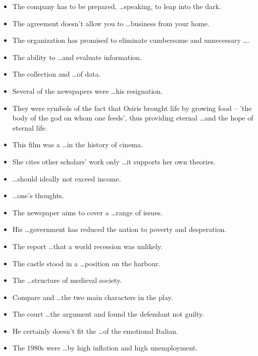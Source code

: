 \documentclass[a4paper,10pt]{article}
\theoremstyle{discussion_style} \newtheorem{discussion}{\color{red}{Discussion point}}
\theoremstyle{theorem_style} \newtheorem{theorem}{Theorem}
\begin{document}
\begin{itemize}
\item The company has to be prepared, \ldots speaking, to leap into the dark.
\item The agreement doesn't allow you to \ldots business from your home.
\item The organization has promised to eliminate cumbersome and unnecessary \ldots.
\item The ability to \ldots and evaluate information.
\item The collection and \ldots of data.
\item Several of the newspapers were \ldots his resignation.
\item They were symbols of the fact that Osiris brought life by growing food -- 'the body of the god on whom one feeds', thus providing eternal \ldots and the hope of eternal life.
\item This film was a \ldots in the history of cinema.
\item She cites other scholars' work only \ldots it supports her own theories.
\item \ldots should ideally not exceed income.
\item \ldots one's thoughts.
\item The newspaper aims to cover a \ldots range of issues.
\item His \ldots government has reduced the nation to poverty and desperation.
\item The report \ldots that a world recession was unlikely.
\item The castle stood in a \ldots position on the harbour.
\item The \ldots structure of medieval society.
\item Compare and \ldots the two main characters in the play. 
\item The court \ldots the argument and found the defendant not guilty.
\item He certainly doesn't fit the \ldots of the emotional Italian.
\item The 1980s were \ldots by high inflation and high unemployment.
\end{itemize}
\end{document}
